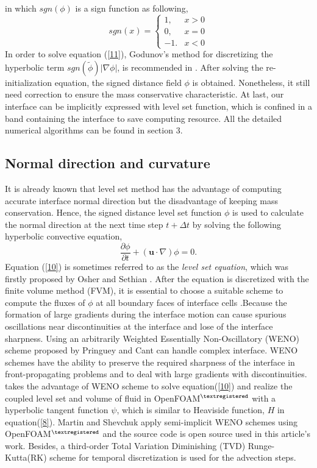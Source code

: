 in which $sgn(\phi)$ is a sign function as following,
\begin{equation}\label{12}
sgn(x)=\left\{
\begin{array}{lc}
1,& x>0\\
0,& x=0\\
-1.& x<0
\end{array}
\right.
\end{equation}
In order to solve equation (\ref{11}), Godunov's method for discretizing the hyperbolic term  $sgn(\tilde{\phi})\left|\nabla\phi\right|$, is recommended in \cite{osher2006level}. After solving the re-initialization equation, the signed distance field $\phi$ is obtained. Nonetheless, it still need correction to ensure the mass conservative characteristic. At last, our interface can be implicitly expressed with level set function, which is confined in a band containing the interface to save computing resource. All the detailed numerical algorithms can be found in section 3.

\subsection{Normal direction and curvature}
It is already known that level set method has the advantage of computing accurate interface normal direction but the disadvantage of keeping mass conservation. Hence, the signed distance level set function $\phi$ is used to calculate the normal direction at the next time step $t+\Delta{t}$ by solving the following hyperbolic convective equation,
\begin{equation}\label{10}
\frac{\partial\phi}{\partial{t}}+(\mathbf{u}\cdot\nabla)\phi=0.
\end{equation}
Equation (\ref{10}) is sometimes referred to as the \textit{level set equation}, which was firstly proposed by Osher and Sethian \cite{osher1988fronts}. After the equation is discretized with the finite volume method (FVM), it is essential to choose a suitable scheme to compute the fluxes of $\phi$ at all boundary faces of interface cells\cite{martin2018implementation} .Because the formation of large gradients during the interface motion can cause spurious oscillations near discontinuities at the interface and lose of the interface sharpness\cite{pringuey2012large}. Using an arbitrarily Weighted Essentially Non-Oscillatory (WENO) scheme proposed by Pringuey and Cant \cite{pringuey2012high} can handle complex interface. WENO schemes have the ability to preserve the required sharpness of the interface in front-propagating problems and to deal with large gradients with discontinuities. \cite{bilger2017evaluation} takes the advantage of WENO scheme to solve equation(\ref{10}) and realize the coupled level set and volume of fluid in OpenFOAM$^{\textregistered}$ with a hyperbolic tangent function $\psi$, which is similar to Heaviside function, $H$ in equation(\ref{8}). Martin and Shevchuk\cite{martin2018implementation} apply semi-implicit WENO schemes using OpenFOAM$^{\textregistered}$ and the source code is open source used in this article's work. Besides, a third-order Total Variation Diminishing (TVD) Runge-Kutta(RK) scheme for temporal discretization is used for the advection steps\cite{pringuey2014robust}.

